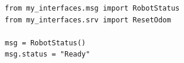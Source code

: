 \documentclass[preview,border=2pt]{standalone}
\begin{document}
\begin{lstlisting}[style=pythonstyle]
from my_interfaces.msg import RobotStatus
from my_interfaces.srv import ResetOdom

msg = RobotStatus()
msg.status = "Ready"
\end{lstlisting}
\end{document}
